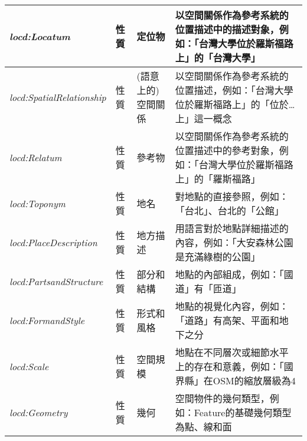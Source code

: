 \begin{table}[htbp]
\begin{adjustbox}{max width=\textwidth}
\begin{tabular}{>{\centering\arraybackslash}m{3.5cm} >{\centering\arraybackslash}m{1.5cm} >{\centering\arraybackslash}m{2cm} >{\centering\arraybackslash}m{10cm}}
\hline
\textit{locd:Locatum} & 性質 & 定位物 & 以空間關係作為參考系統的位置描述中的描述對象，例如：「台灣大學位於羅斯福路上」的「台灣大學」 \\
\hline
\textit{locd:SpatialRelationship} & 性質 & (語意上的)空間關係 & 以空間關係作為參考系統的位置描述，例如：「台灣大學位於羅斯福路上」的「位於…上」這一概念 \\
\hline
\textit{locd:Relatum} & 性質 & 參考物 & 以空間關係作為參考系統的位置描述中的參考對象，例如：「台灣大學位於羅斯福路上」的「羅斯福路」 \\
\hline
\textit{locd:Toponym} & 性質 & 地名 & 對地點的直接參照，例如：「台北」、台北的「公館」 \\
\hline
\textit{locd:PlaceDescription} & 性質 & 地方描述 & 用語言對於地點詳細描述的內容，例如：「大安森林公園是充滿綠樹的公園」 \\
\hline
\textit{locd:PartsandStructure} & 性質 & 部分和結構 & 地點的內部組成，例如：「國道」有「匝道」 \\
\hline
\textit{locd:FormandStyle} & 性質 & 形式和風格 & 地點的視覺化內容，例如：「道路」有高架、平面和地下之分 \\
\hline
\textit{locd:Scale} & 性質 & 空間規模 & 地點在不同層次或細節水平上的存在和意義，例如：「國界縣」在OSM的縮放層級為4 \\
\hline
\textit{locd:Geometry} & 性質 & 幾何 & 空間物件的幾何類型，例如：Feature的基礎幾何類型為點、線和面 \\
\bottomrule
\end{tabular}
\end{adjustbox}
\end{table}
